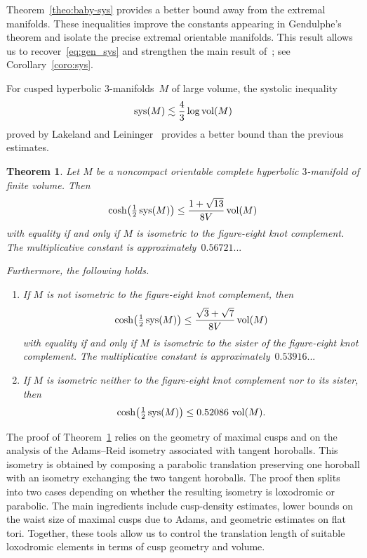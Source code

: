 \documentclass[11pt,reqno]{amsart}
\newtheorem{theorem}{Theorem}[section]
\theoremstyle{definition}
\numberwithin{equation}{section}
\DeclareMathOperator{\vol}{{\rm vol}}
\DeclareMathOperator{\sys}{{\rm sys}}
\numberwithin{equation}{section}
\begin{document}
Theorem~\ref{theo:baby-sys} provides a better bound away from the extremal manifolds.
These inequalities improve the constants appearing in Gendulphe's theorem and isolate the precise extremal orientable manifolds.
This result allows us to recover~\eqref{eq:gen_sys} and strengthen the main result of~\cite{gen}; see Corollary~\ref{coro:sys}.

\medskip

For cusped hyperbolic $3$-manifolds~$M$ of large volume, the systolic inequality
\[
\sys(M) \lesssim \frac{4}{3} \log \vol(M)
\]
proved by Lakeland and Leininger~\cite{LL} provides a better bound than the previous estimates.


\forget

\begin{theorem} \label{theo:sys}
Let $M$ be a noncompact orientable complete hyperbolic $3$-manifold of finite volume.
Then
\[
\cosh \!\left(\tfrac{1}{2} \sys(M) \right) \leq \frac{1+\sqrt{13}}{8 V} \vol(M)
\]
with equality if and only if $M$ is isometric to the figure-eight knot complement.
The multiplicative constant is approximately~$0.56721...$

Furthermore, the following holds.
\begin{enumerate}
\item If $M$ is not isometric to the figure-eight knot complement, then 
\[
\cosh \!\left(\tfrac{1}{2} \sys(M) \right) \leq \frac{\sqrt{3}+\sqrt{7}}{8 V} \vol(M)
\]
with equality if and only if $M$ is isometric to the sister of the figure-eight knot complement.
The multiplicative constant is approximately~$0.53916...$
\item If $M$ is isometric neither to the figure-eight knot complement nor to its sister, then 
\[
\cosh \!\left(\tfrac{1}{2} \sys(M) \right) \leq 0.52086 \, \vol(M).
\]
\end{enumerate}
\end{theorem}

\forgotten

\medskip

The proof of Theorem~\ref{theo:sys} relies on the geometry of maximal cusps and on the analysis of the Adams--Reid isometry associated with tangent horoballs.
This isometry is obtained by composing a parabolic translation preserving one horoball with an isometry exchanging the two tangent horoballs.
The proof then splits into two cases depending on whether the resulting isometry is loxodromic or parabolic.
The main ingredients include cusp-density estimates, lower bounds on the waist size of maximal cusps due to Adams, and geometric estimates on flat tori. 
Together, these tools allow us to control the translation length of suitable loxodromic elements in terms of cusp geometry and volume.
\end{document}
